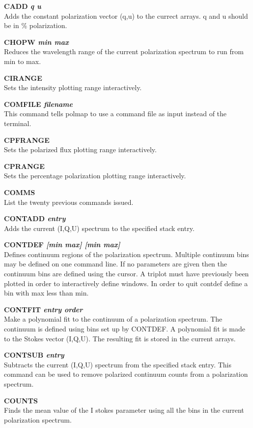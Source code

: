\documentclass[11pt,nolof,noabs]{starlink}
\begin{document}
\textbf{CADD \it q u} \\
Adds the constant polarization vector (q,u) to the currect arrays. q and u
should be in \% polarization.

\textbf{CHOPW \it min max} \\
Reduces the wavelength range of the current polarization spectrum to run from
min to  max.

\textbf{CIRANGE} \\
Sets the intensity plotting range interactively.

\textbf{COMFILE \it filename} \\
This command tells  polmap to use a command file as input instead of the
terminal.

\textbf{CPFRANGE} \\
Sets the polarized flux plotting range interactively.

\textbf{CPRANGE} \\
Sets the percentage polarization plotting range interactively.

\textbf{COMMS} \\
List the twenty previous commands issued.

\textbf{CONTADD \it entry} \\
Adds the current (I,Q,U) spectrum to the specified stack entry.

\textbf{CONTDEF \it  [min max] [min max] } \\
Defines continuum regions of the polarization spectrum. Multiple continuum bins
may be defined on one command line. If no parameters are given then the
continuum bins are defined using the cursor. A triplot must have previously
been plotted in order to interactively define windows. In order to quit contdef
define a bin with  max less than  min.

\textbf{CONTFIT \it entry order } \\
Make a polynomial fit to the continuum of a polarization spectrum. The
continuum is defined using bins set up by  CONTDEF. A polynomial fit is
made to the Stokes vector (I,Q,U). The resulting fit is stored in the
current arrays.

\textbf{CONTSUB \it entry  } \\
Subtracts the current (I,Q,U) spectrum from the specified stack entry. This
command can be used to remove polarized continuum counts from a polarization
spectrum.

\textbf{COUNTS} \\
Finds the mean value of the I stokes parameter using all the bins in the
current polarization spectrum.
\end{document}

